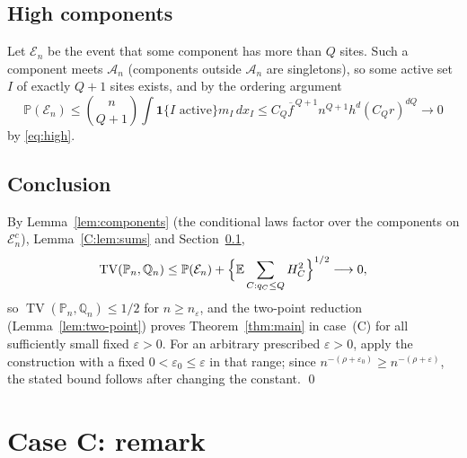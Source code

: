\documentclass[11pt]{article}
\DeclareMathOperator{\TV}{TV}
\newcommand{\E}{\mathbb{E}}
\newcommand{\PP}{\mathbb{P}}
\newcommand{\one}{\mathbf{1}}
\begin{document}
\subsection{High components}\label{C:sec:high}
Let \(\mathcal E_n\) be the event that some component has more than
\(Q\) sites.  Such a component meets \(\mathcal A_n\) (components outside
\(\mathcal A_n\) are singletons), so some active set \(I\) of exactly
\(Q+1\) sites exists, and by the ordering argument
\[
 \PP(\mathcal E_n)\le\binom n{Q+1}\int\one\{I\text{ active}\}m_I\,dx_I
 \le C_Q\overline f^{\,Q+1}n^{Q+1}h^d(C_Qr)^{dQ}\to0
\]
by \eqref{eq:high}.

\subsection{Conclusion}
By Lemma~\ref{lem:components} (the conditional laws factor over the
components on \(\mathcal E_n^c\)), Lemma~\ref{C:lem:sums} and
Section~\ref{C:sec:high},
\[
 \TV(\PP_n,\mathbb Q_n)\le\PP(\mathcal E_n)+\Bigl\{\E\sum_{C:q_C\le Q}H^2_C\Bigr\}^{1/2}\longrightarrow0 ,
\]
so \(\TV(\PP_n,\mathbb Q_n)\le1/2\) for \(n\ge n_\varepsilon\), and the
two-point reduction (Lemma~\ref{lem:two-point}) proves
Theorem~\ref{thm:main} in case~(C) for all sufficiently small fixed
\(\varepsilon>0\).  For an arbitrary prescribed
\(\varepsilon>0\), apply the construction with a fixed
\(0<\varepsilon_0\le\varepsilon\) in that range; since
\(n^{-(\rho+\varepsilon_0)}\ge n^{-(\rho+\varepsilon)}\), the stated bound
follows after changing the constant.  \qed

\section{Case C: remark}\label{C:sec:remarks}
\end{document}
